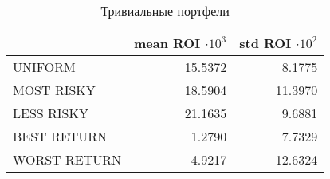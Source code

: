 \begin{table}[H]
\caption{Тривиальные портфели}
\label{tab:trivial_rois}
\begin{tabular}{lrr}
\toprule
 & mean ROI $\cdot 10^3$ & std ROI $\cdot 10^2$ \\
\midrule
UNIFORM & 15.5372 & 8.1775 \\
MOST RISKY & 18.5904 & 11.3970 \\
LESS RISKY & 21.1635 & 9.6881 \\
BEST RETURN & 1.2790 & 7.7329 \\
WORST RETURN & 4.9217 & 12.6324 \\
\bottomrule
\end{tabular}
\end{table}
